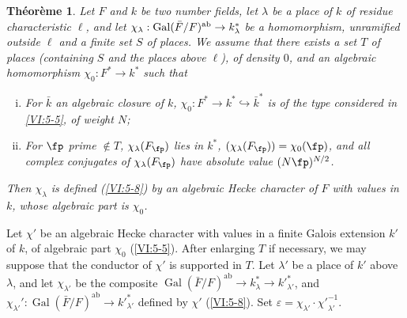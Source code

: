 \documentclass[oneside]{book}
\DeclareMathOperator{\gal}{Gal}
\newcounter{char}
\theoremstyle{sga-source}
\theoremstyle{sga-source-dash}
\theoremstyle{sga-source-dotdash}
\theoremstyle{sga-source-number-note-dash}
\theoremstyle{sga-source-note-number-dotdash}
\theoremstyle{sga-source-example-dotdash}
\theoremstyle{sga-source-inline-number}
\theoremstyle{sga-source-bare-number}
\theoremstyle{sga-source}
\newtheorem{theorem_}[subsection]{Théorème}
\newcommand{\PrintPage}[1]{}\newcommand{\MathPage}[1]{}\newcommand{\PrintCite}[2]{#1}\newcommand{\var}[3]{#1}
\begin{document}
\begin{theorem_}\label{VI:5-10}
Let $F$ and $k$ be two number fields, let $\lambda$ be a place of $k$ of 
residue characteristic $\ell$, and let 
$\chi_\lambda:\gal(\bar F/F)^\textnormal{ab}\to k_\lambda^\ast$ be a 
homomorphism, unramified outside $\ell$ and a finite set $S$ of 
places. We assume that there exists a set $T$ of places (containing $S$ and the 
places above $\ell$), of density $0$, and an algebraic homomorphism 
$\chi_0:F^\ast \to k^\ast$ such that 
\begin{enumerate}[(i)]
  \item For $\bar k$ an algebraic closure of $k$, 
    $\chi_0:F^\ast \to k^\ast \hookrightarrow \bar k^\ast$ is of the type 
    considered in \ref{VI:5-5}, of weight $N$; 
  \PrintPage{212}
\item For $\fp$ prime $\notin T$, $\chi_\lambda(F_\fp)$ lies in 
    $k^\ast$, $(\chi_\lambda(F_\fp))=\chi_0(\fp)$, and all complex conjugates 
    of $\chi_\lambda(F_\fp)$ have absolute value $(N \fp)^{N/2}$. 
\end{enumerate}

Then $\chi_\lambda$ is defined (\ref{VI:5-8}) by an algebraic Hecke character 
of $F$ with values in $k$, whose algebraic part is $\chi_0$. 
\end{theorem_}

Let $\chi'$ be an algebraic Hecke character with values in a 
finite Galois extension $k'$ of $k$, of algebraic part $\chi_0$ 
(\ref{VI:5-5}). After enlarging $T$ if necessary, we may suppose that the conductor of 
$\chi'$ is supported in $T$. Let $\lambda'$ be a place of $k'$ above 
$\lambda$, and let $\chi_{\lambda'}$ be the composite 
$\gal(\bar F/F)^\text{ab}\to k_\lambda^\ast \to {k'}_{\lambda'}^\ast$, and 
$\chi_{\lambda'}':\gal(\bar F/F)^\text{ab}\to {k'}_{\lambda'}^\ast$ defined 
by $\chi'$ (\ref{VI:5-8}). Set 
$\varepsilon = \chi_{\lambda'} \cdot {\chi'}_{\lambda'}^{-1}$.
\end{document}
